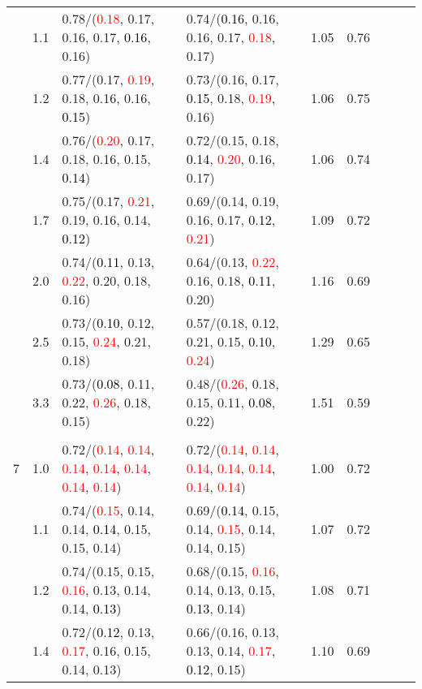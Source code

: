 \documentclass[10pt,a4paper]{report}
\begin{document}
\begin{table}[!htbp]
\begin{center}
{\begin{tabular}{ccllccccc}
			&1.1&0.78/(\textcolor{red}{0.18}, 0.17, 0.16, 0.17, \textcolor{black}{0.16}, 0.16)&0.74/(\textcolor{black}{0.16}, 0.16, 0.16, 0.17, \textcolor{red}{0.18}, 0.17)&1.05&0.76\\
			&1.2&0.77/(0.17, \textcolor{red}{0.19}, 0.18, 0.16, 0.16, \textcolor{black}{0.15})&0.73/(0.16, 0.17, \textcolor{black}{0.15}, 0.18, \textcolor{red}{0.19}, 0.16)&1.06&0.75\\
			&1.4&0.76/(\textcolor{red}{0.20}, 0.17, 0.18, 0.16, 0.15, \textcolor{black}{0.14})&0.72/(0.15, 0.18, \textcolor{black}{0.14}, \textcolor{red}{0.20}, 0.16, 0.17)&1.06&0.74\\
			&1.7&0.75/(0.17, \textcolor{red}{0.21}, 0.19, 0.16, 0.14, \textcolor{black}{0.12})&0.69/(0.14, 0.19, 0.16, 0.17, \textcolor{black}{0.12}, \textcolor{red}{0.21})&1.09&0.72\\
			&2.0&0.74/(\textcolor{black}{0.11}, 0.13, \textcolor{red}{0.22}, 0.20, 0.18, 0.16)&0.64/(0.13, \textcolor{red}{0.22}, 0.16, 0.18, \textcolor{black}{0.11}, 0.20)&1.16&0.69\\
			&2.5&0.73/(\textcolor{black}{0.10}, 0.12, 0.15, \textcolor{red}{0.24}, 0.21, 0.18)&0.57/(0.18, 0.12, 0.21, 0.15, \textcolor{black}{0.10}, \textcolor{red}{0.24})&1.29&0.65\\
			&3.3&0.73/(\textcolor{black}{0.08}, 0.11, 0.22, \textcolor{red}{0.26}, 0.18, 0.15)&0.48/(\textcolor{red}{0.26}, 0.18, 0.15, 0.11, \textcolor{black}{0.08}, 0.22)&1.51&0.59\\
			&&&&\\
			7			&1.0&0.72/(\textcolor{red}{0.14}, \textcolor{red}{0.14}, \textcolor{red}{0.14}, \textcolor{red}{0.14}, \textcolor{red}{0.14}, \textcolor{red}{0.14}, \textcolor{red}{0.14})&0.72/(\textcolor{red}{0.14}, \textcolor{red}{0.14}, \textcolor{red}{0.14}, \textcolor{red}{0.14}, \textcolor{red}{0.14}, \textcolor{red}{0.14}, \textcolor{red}{0.14})&1.00&0.72\\
			&1.1&0.74/(\textcolor{red}{0.15}, 0.14, 0.14, \textcolor{black}{0.14}, 0.15, 0.15, 0.14)&0.69/(\textcolor{black}{0.14}, 0.15, 0.14, \textcolor{red}{0.15}, 0.14, 0.14, 0.15)&1.07&0.72\\
			&1.2&0.74/(0.15, 0.15, \textcolor{red}{0.16}, 0.13, 0.14, 0.14, \textcolor{black}{0.13})&0.68/(0.15, \textcolor{red}{0.16}, 0.14, 0.13, 0.15, \textcolor{black}{0.13}, 0.14)&1.08&0.71\\
			&1.4&0.72/(\textcolor{black}{0.12}, 0.13, \textcolor{red}{0.17}, 0.16, 0.15, 0.14, 0.13)&0.66/(0.16, 0.13, 0.13, 0.14, \textcolor{red}{0.17}, \textcolor{black}{0.12}, 0.15)&1.10&0.69\\

\end{tabular}}
\end{center}
\end{table}
\end{document}
